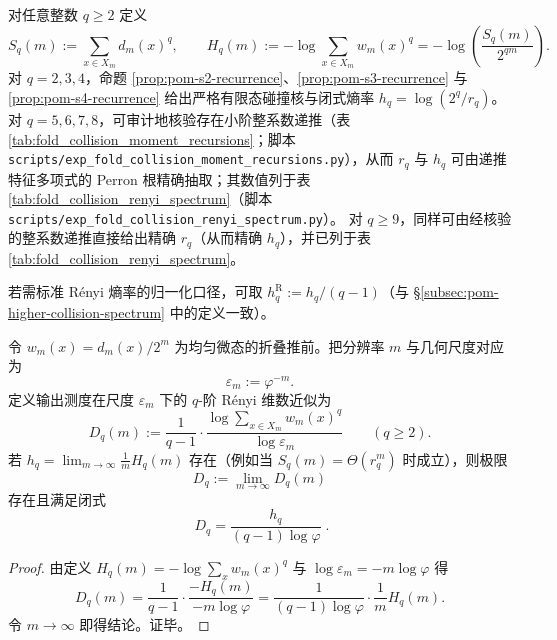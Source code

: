 \begin{remark}[\texorpdfstring{$\mathrm{R\acute{e}nyi}$}{Renyi} 指纹谱：从 \texorpdfstring{$q=2,3$}{q=2,3} 到更高阶]\label{rem:pom-renyi-spectrum}
对任意整数 \(q\ge 2\) 定义
$$
S_q(m):=\sum_{x\in X_m} d_m(x)^q,\qquad
H_q(m):=-\log\sum_{x\in X_m}w_m(x)^q=-\log\!\left(\frac{S_q(m)}{2^{qm}}\right).
$$
对 \(q=2,3,4\)，命题 \ref{prop:pom-s2-recurrence}、\ref{prop:pom-s3-recurrence} 与 \ref{prop:pom-s4-recurrence} 给出严格有限态碰撞核与闭式熵率 \(h_q=\log(2^q/r_q)\)。
对 \(q=5,6,7,8\)，可审计地核验存在小阶整系数递推（表 \ref{tab:fold_collision_moment_recursions}；脚本 \texttt{scripts/exp\_fold\_collision\_moment\_recursions.py}），从而 \(r_q\) 与 \(h_q\) 可由递推特征多项式的 Perron 根精确抽取；其数值列于表 \ref{tab:fold_collision_renyi_spectrum}（脚本 \texttt{scripts/exp\_fold\_collision\_renyi\_spectrum.py}）。
对 \(q\ge 9\)，同样可由经核验的整系数递推直接给出精确 \(r_q\)（从而精确 \(h_q\)），并已列于表 \ref{tab:fold_collision_renyi_spectrum}。
\par
若需标准 Rényi 熵率的归一化口径，可取 \(h_q^{\mathrm{R}}:=h_q/(q-1)\)（与 \S\ref{subsec:pom-higher-collision-spectrum} 中的定义一致）。
\end{remark}



\begin{proposition}\label{prop:pom-renyi-dimension-spectrum}
令 \(w_m(x)=d_m(x)/2^m\) 为均匀微态的折叠推前。把分辨率 \(m\) 与几何尺度对应为
\[
\varepsilon_m:=\varphi^{-m}.
\]
定义输出测度在尺度 \(\varepsilon_m\) 下的 \(q\)-阶 Rényi 维数近似为
\[
D_q(m):=\frac{1}{q-1}\cdot \frac{\log\sum_{x\in X_m}w_m(x)^q}{\log \varepsilon_m}
\qquad(q\ge 2).
\]
若 \(h_q=\lim_{m\to\infty}\frac{1}{m}H_q(m)\) 存在（例如当 \(S_q(m)=\Theta(r_q^m)\) 时成立），则极限
\[
D_q:=\lim_{m\to\infty}D_q(m)
\]
存在且满足闭式
\[
\boxed{\;
D_q=\frac{h_q}{(q-1)\log\varphi}\; }.
\]
\end{proposition}
\begin{proof}
由定义 \(H_q(m)=-\log\sum_x w_m(x)^q\) 与 \(\log\varepsilon_m=-m\log\varphi\) 得
\[
D_q(m)=\frac{1}{q-1}\cdot \frac{-H_q(m)}{-m\log\varphi}
=\frac{1}{(q-1)\log\varphi}\cdot \frac{1}{m}H_q(m).
\]
令 \(m\to\infty\) 即得结论。证毕。
\end{proof}

